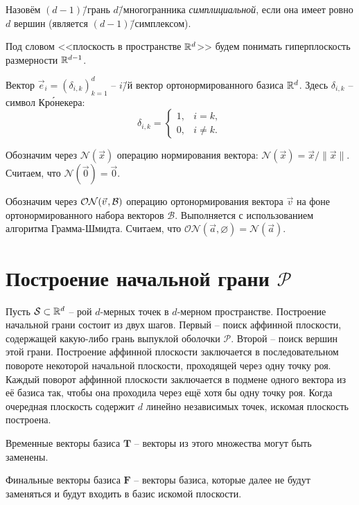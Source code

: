 \documentclass[a4paper,12pt]{article}
\newcommand{\R}[1][]{%
  \ifthenelse{\equal{#1}{}}%
  {\mathbb{R}}%
  {\mathbb{R}^{#1}}}
\newcommand{\Swarm}{\mathcal{S}}              %
\newcommand{\Polytop}{\mathcal{P}}         %
\newcommand{\Basis}{\mathcal{B}}              %
\newcommand{\ZVec}{\vec 0}                    %
\newcommand{\norm}[2][]{#1\lVert #2 #1\rVert}             %
\newcommand{\Norm}[2][]{\mathcal{N}#1( #2 #1)} %
\newcommand{\ONorm}[3][]{\mathcal{ON}#1( #2, #3 #1)} %
\newcommand{\TempVec}{\mathbf{T}}  %
\newcommand{\FinalVec}{\mathbf{F}} %
\renewcommand{\.}{\hspace{0.2ex}}
\begin{document}
  Назовём $(d-1)$\=/грань $d$\=/многогранника \textit{симплициальной}, если она имеет ровно $d$ вершин (является $(d-1)$\=/симплексом).



  Под словом <<плоскость в пространстве $\R[d]$>> будем понимать гиперплоскость размерности $\R[d-1]$.

  Вектор $\vec e_i = (\delta_{i,k})_{k=1}^d$ -- $i$\=/й вектор ортонормированного базиса $\R[d]$.
  Здесь $\delta_{i,k}$ -- символ Кр\'{о}некера:
  $$
  \delta_{i,k} =
  \begin{cases}
    1, & i=k, \\
    0, & i\neq k.
  \end{cases}
  $$

  Обозначим через $\Norm{\vec x}$ операцию нормирования вектора: $\Norm{\vec x} = \vec x \big / \norm{\vec x}$. Считаем, что $\Norm{\ZVec} = \ZVec$.

  Обозначим через $\ONorm{\vec v \.}{\Basis}$ операцию ортонормирования вектора $\vec v$ на фоне ортонормированного набора векторов $\Basis$. Выполняется с использованием алгоритма Грамма-Шмидта. Считаем, что $\ONorm{\vec a}{\varnothing} = \Norm{\vec a}$.


\section{Построение начальной грани $\Polytop$}
  Пусть $\Swarm \subset \R[d]$ -- рой $d$-мерных точек в $d$-мерном пространстве. Построение начальной грани состоит из двух шагов. Первый -- поиск аффинной плоскости, содержащей какую-либо грань выпуклой оболочки $\Polytop$. Второй -- поиск вершин этой грани. Построение аффинной плоскости заключается в последовательном повороте некоторой начальной плоскости, проходящей через одну точку роя. Каждый поворот аффинной плоскости заключается в подмене одного вектора из её базиса так, чтобы она проходила через ещё хотя бы одну точку роя. Когда очередная плоскость содержит $d$ линейно независимых точек, искомая плоскость построена.

  Временные векторы базиса $\TempVec$ -- векторы из этого множества могут быть заменены.

  Финальные векторы базиса $\FinalVec$ -- векторы базиса, которые далее не будут заменяться и будут входить в базис искомой плоскости.
\end{document}
